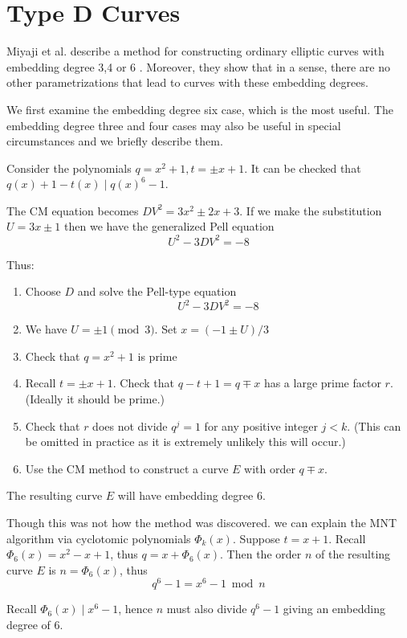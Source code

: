 \section {Type D Curves}

Miyaji et al. describe a method for constructing ordinary elliptic
curves with embedding degree 3,4 or 6 \cite{mnt}. Moreover, they show
that in a sense, there are no other parametrizations that lead to curves
with these embedding degrees.

We first examine the embedding degree six case, which is the most useful.
The embedding degree three and four cases may also be useful in special
circumstances and we briefly describe them.

Consider the polynomials $q = x^2 + 1, t = \pm x + 1$.
It can be checked that $q(x) + 1 - t(x) \mid q(x)^6 - 1$.

The CM equation becomes $D V^2 = 3 x^2 \pm 2 x + 3$. If we make
the substitution $U = 3x \pm 1$ then we have the generalized Pell equation
\[
U^2 - 3DV^2 = -8
\]

Thus:

\begin{enumerate}
\item
Choose $D$ and solve the Pell-type equation
\[ U^2 - 3DV^2 = -8 \]
\item
We have $U = \pm 1 \pmod 3$. Set $x = (-1 \pm U) / 3$
\item
Check that $q = x^2 + 1$ is prime
\item
Recall $t = \pm x + 1$.
Check that $q - t + 1 = q \mp x$ has a large prime factor $r$.
(Ideally it should be prime.)
\item
Check that $r$ does not divide $q^j = 1$ for any positive integer $j < k$.
(This can be omitted in practice as it is extremely unlikely this will
occur.)
\item
Use the CM method to construct a curve $E$ with order $q \mp x$.
\end{enumerate}

The resulting curve $E$ will have embedding degree 6.

Though this was not how the method was discovered.
we can explain the MNT algorithm via cyclotomic polynomials $\Phi_k(x)$.
Suppose $t = x + 1$.
Recall $\Phi_6(x) = x^2 - x + 1$, thus
$q = x + \Phi_6(x)$.
Then the order $n$ of the resulting
curve $E$ is $n = \Phi_6(x)$, thus
\[ q^6 - 1 = x^6 - 1 \bmod n \]

Recall $\Phi_6(x) \mid x^6 - 1$, hence $n$ must also divide $q^6 - 1$
giving an embedding degree of 6.

